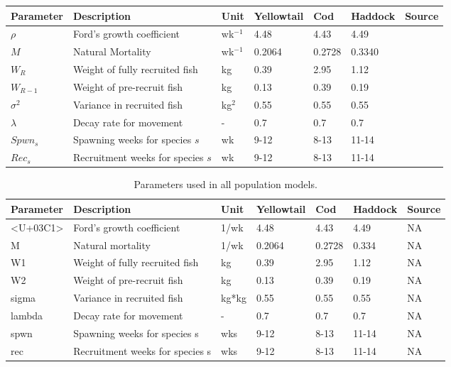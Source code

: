 \documentclass[
  12pt,
]{article}
\begin{document}
\begin{longtable}[]{@{}lllllll@{}}
\toprule
Parameter & Description & Unit & Yellowtail & Cod & Haddock & Source \\
\midrule
\endhead
\(\rho\) & Ford's growth coefficient & wk\(^{-1}\) & 4.48 & 4.43 & 4.49 & \\
\(M\) & Natural Mortality & wk\(^{-1}\) & 0.2064 & 0.2728 & 0.3340 & \\
\(W_R\) & Weight of fully recruited fish & kg & 0.39 & 2.95 & 1.12 & \\
\(W_{R-1}\) & Weight of pre-recruit fish & kg & 0.13 & 0.39 & 0.19 & \\
\(\sigma^2\) & Variance in recruited fish & kg\(^2\) & 0.55 & 0.55 & 0.55 & \\
\(\lambda\) & Decay rate for movement & - & 0.7 & 0.7 & 0.7 & \\
\(Spwn_s\) & Spawning weeks for species \(s\) & wk & 9-12 & 8-13 & 11-14 & \\
\(Rec_s\) & Recruitment weeks for species \(s\) & wk & 9-12 & 8-13 & 11-14 & \\
\bottomrule
\end{longtable}

\begin{table}
 
 \caption{\label{tab:paramsALL2}Parameters used in all population models.}
 \centering
 \fontsize{10}{12}\selectfont
 \begin{tabular}[t]{lllllll}
 \toprule
 Parameter & Description & Unit & Yellowtail & Cod & Haddock & Source\\
 \midrule
 <U+03C1> & Ford's growth coefficient & 1/wk & 4.48 & 4.43 & 4.49 & NA\\
 M & Natural mortality & 1/wk & 0.2064 & 0.2728 & 0.334 & NA\\
 W1 & Weight of fully recruited fish & kg & 0.39 & 2.95 & 1.12 & NA\\
 W2 & Weight of pre-recruit fish & kg & 0.13 & 0.39 & 0.19 & NA\\
 sigma & Variance in recruited fish & kg*kg & 0.55 & 0.55 & 0.55 & NA\\
 \addlinespace
 lambda & Decay rate for movement & - & 0.7 & 0.7 & 0.7 & NA\\
 spwn & Spawning weeks for species s & wks & 9-12 & 8-13 & 11-14 & NA\\
 rec & Recruitment weeks for species s & wks & 9-12 & 8-13 & 11-14 & NA\\
 \bottomrule
 \end{tabular}
 \end{table}
\end{document}
